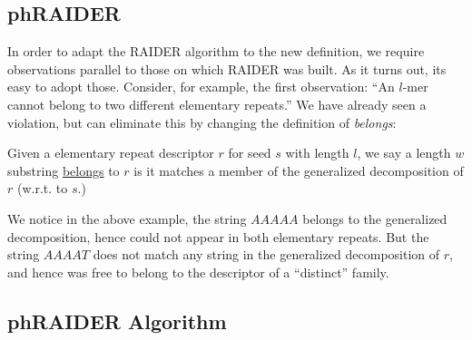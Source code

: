 \documentclass{bmcart}
\begin{document}
\subsection*{phRAIDER}

In order to adapt the RAIDER algorithm to the new definition, we
require observations parallel to those on which RAIDER was built.  As
it turns out, its easy to adopt those.  Consider, for example, the
first observation: ``An $l$-mer cannot belong to two different
elementary repeats.''  We have already seen a violation, but can
eliminate this by changing the definition of {\it belongs}:
\begin{definition}
  Given a elementary repeat descriptor $r$ for seed $s$ with length
  $l$, we say a length $w$ substring \underline{belongs} to $r$ is it
  matches a member of the generalized decomposition of $r$ (w.r.t. to
  $s$.)
\end{definition}
We notice in the above example, the string $AAAAA$ belongs to the
generalized decomposition, hence could not appear in both elementary
repeats.  But the string $AAAAT$ does not match any string in the
generalized decomposition of $r$, and hence was free to belong to
the descriptor of a ``distinct'' family.

\subsection*{phRAIDER Algorithm}



  
    









\end{document}
